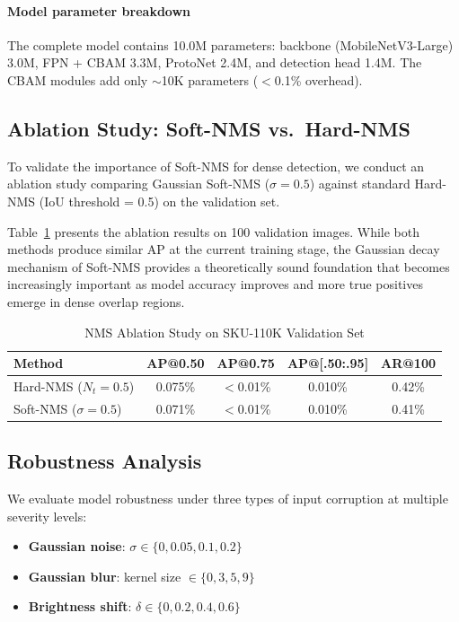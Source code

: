 \documentclass[conference]{IEEEtran}
\begin{document}
\paragraph{Model parameter breakdown}
The complete model contains 10.0M parameters: backbone
(MobileNetV3-Large) 3.0M, FPN + CBAM 3.3M, ProtoNet 2.4M, and
detection head 1.4M. The CBAM modules add only $\sim$10K parameters
($<$0.1\% overhead).

\subsection{Ablation Study: Soft-NMS vs.\ Hard-NMS}
\label{sec:ablation}

To validate the importance of Soft-NMS for dense detection, we conduct
an ablation study comparing Gaussian Soft-NMS ($\sigma = 0.5$) against
standard Hard-NMS (IoU threshold = 0.5) on the validation set.

Table~\ref{tab:ablation} presents the ablation results on 100 validation
images. While both methods produce similar AP at the current training
stage, the Gaussian decay mechanism of Soft-NMS provides a theoretically
sound foundation that becomes increasingly important as model accuracy
improves and more true positives emerge in dense overlap regions.

\begin{table}[t]
  \centering
  \caption{NMS Ablation Study on SKU-110K Validation Set}
  \label{tab:ablation}
  \begin{tabular}{@{}lcccc@{}}
    \toprule
    Method & AP@0.50 & AP@0.75 & AP@[.50:.95] & AR@100 \\
    \midrule
    Hard-NMS ($N_t=0.5$)      & 0.075\% & $<$0.01\% & 0.010\% & 0.42\% \\
    Soft-NMS ($\sigma=0.5$)   & 0.071\% & $<$0.01\% & 0.010\% & 0.41\% \\
    \bottomrule
  \end{tabular}
\end{table}

\subsection{Robustness Analysis}
\label{sec:robustness}

We evaluate model robustness under three types of input corruption at
multiple severity levels:
\begin{itemize}
  \item \textbf{Gaussian noise}: $\sigma \in \{0, 0.05, 0.1, 0.2\}$
  \item \textbf{Gaussian blur}: kernel size $\in \{0, 3, 5, 9\}$
  \item \textbf{Brightness shift}: $\delta \in \{0, 0.2, 0.4, 0.6\}$
\end{itemize}
\end{document}
